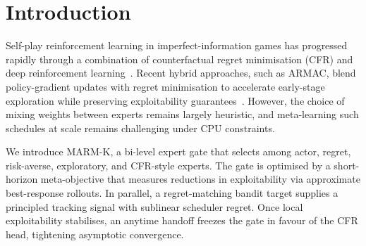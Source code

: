 \documentclass{icml2024}
\begin{document}

\begin{abstract}
We present the Meta-Adaptive Regret Mixing with Anytime CFR Handoff (MARM-K) framework for two-player zero-sum poker. MARM-K couples a bi-level expert gate trained by short-horizon meta-gradients with a regret-matching bandit target and an anytime handoff into tabular CFR experts. The resulting scheduler enjoys provable sublinear regret while remaining practical on commodity CPUs thanks to a deterministic Rust backend. Empirically, MARM-K reduces exploitability faster than fixed schedules and inherits the asymptotic guarantees of CFR once the handoff triggers.
\end{abstract}

\section{Introduction}
Self-play reinforcement learning in imperfect-information games has progressed rapidly through a combination of counterfactual regret minimisation (CFR) and deep reinforcement learning~\citep{zinkevich2007regret,brown2019superhuman,lanctot2019openspiel}. Recent hybrid approaches, such as ARMAC, blend policy-gradient updates with regret minimisation to accelerate early-stage exploration while preserving exploitability guarantees~\citep{heinrich2016counterfactual}. However, the choice of mixing weights between experts remains largely heuristic, and meta-learning such schedules at scale remains challenging under CPU constraints.

We introduce MARM-K, a bi-level expert gate that selects among actor, regret, risk-averse, exploratory, and CFR-style experts. The gate is optimised by a short-horizon meta-objective that measures reductions in exploitability via approximate best-response rollouts. In parallel, a regret-matching bandit target supplies a principled tracking signal with sublinear scheduler regret. Once local exploitability stabilises, an anytime handoff freezes the gate in favour of the CFR head, tightening asymptotic convergence.
\end{document}
